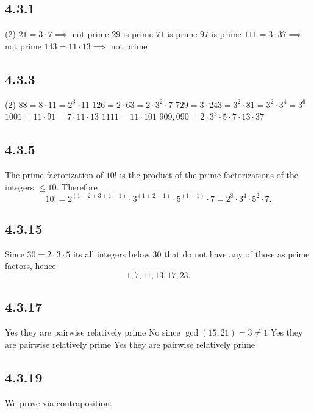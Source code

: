 \documentclass[12pt,titlepage]{extarticle}
\begin{document}
\subsection*{4.3.1}
\begin{tasks}(2)
    \task $21 = 3 \cdot 7 \implies$ not prime
    \task $29$ is prime
    \task $71$ is prime
    \task $97$ is prime
    \task $111 = 3 \cdot 37 \implies$ not prime
    \task $143 = 11 \cdot 13 \implies$ not prime
\end{tasks}

\subsection*{4.3.3}
\begin{tasks}(2)
    \task $88 = 8 \cdot 11 = 2^3 \cdot 11$
    \task $126 = 2 \cdot 63 = 2 \cdot 3^2 \cdot 7$
    \task $729 = 3 \cdot 243 = 3^2 \cdot 81 = 3^2 \cdot 3^4 = 3^6$
    \task $1001 = 11 \cdot 91 = 7 \cdot 11 \cdot 13$
    \task $1111 = 11 \cdot 101$
    \task $909,090 = 2 \cdot 3^3 \cdot 5 \cdot 7 \cdot 13 \cdot 37$
\end{tasks}

\subsection*{4.3.5}
The prime factorization of $10!$ is the product of the prime factorizations of the integers $\leq 10$. Therefore
\[
    10! = 2^{(1+2+3+1+1)} \cdot 3^{(1+2+1)} \cdot 5^{(1+1)} \cdot 7 = 2^8 \cdot 3^4 \cdot 5^2 \cdot 7
.\]

\subsection*{4.3.15}
Since $30 = 2 \cdot 3 \cdot 5$ its all integers below $30$ that do not have any of those as prime factors, hence
\[
    1, 7, 11, 13, 17, 23
.\]

\subsection*{4.3.17}
\begin{tasks}
    \task Yes they are pairwise relatively prime
    \task No since $\gcd(15,21) = 3 \neq 1$
    \task Yes they are pairwise relatively prime 
    \task Yes they are pairwise relatively prime 
\end{tasks}

\subsection*{4.3.19}
We prove via contraposition.
\end{document}
